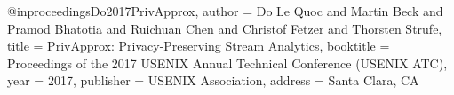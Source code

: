 @inproceedings{Do2017PrivApprox,
	author = {Do Le Quoc and Martin Beck and Pramod Bhatotia and Ruichuan Chen and Christof Fetzer and Thorsten Strufe},
	title = {{PrivApprox: Privacy-Preserving Stream Analytics}},
	booktitle = {Proceedings of the 2017 USENIX Annual Technical Conference (USENIX ATC)},
	year = {2017},
	publisher = {USENIX Association},
    address = {Santa Clara, CA}
} 
